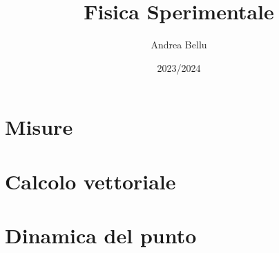 \documentclass{article}
\title{Fisica Sperimentale}
\author{Andrea Bellu}
\date{2023/2024}
\begin{document}
\maketitle

\tableofcontents
\newpage

\section{Misure}





\section{Calcolo vettoriale}




\section{Dinamica del punto}

\end{document}
